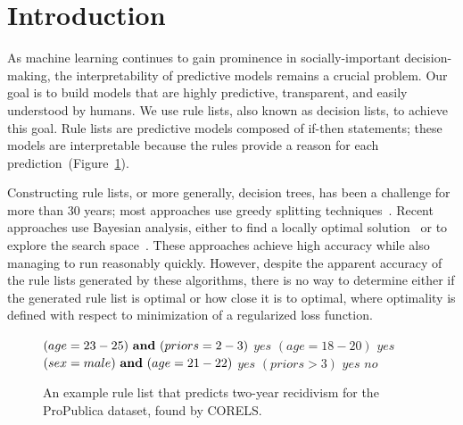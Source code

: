 \section{Introduction}

As machine learning continues to gain prominence in socially-important decision-making,
the interpretability of predictive models remains a crucial problem.
%
Our goal is to build models that are highly predictive, transparent, and easily understood by humans.
%
We use rule lists, also known as decision lists, to achieve this goal.
%
Rule lists are predictive models composed of if-then statements;
these models are interpretable because the rules provide a reason for each prediction~(Figure~\ref{fig:rule-list}).

Constructing rule lists, or more generally, decision trees, has been a challenge for more than
30 years; most approaches use greedy splitting techniques~\citep{Rivest87,Breiman84,Quinlan93}. 
%
Recent approaches use Bayesian analysis, either to find a locally optimal solution~\citep{Chipman:1998jh} or to explore the search space~\citep{LethamRuMcMa15, YangRuSe16}.
%
These approaches achieve high accuracy while also managing to run reasonably quickly.
%
However, despite the apparent accuracy of the rule lists generated by these algorithms,
there is no way to determine either if the generated rule list is optimal or how close it is to optimal,
where optimality is defined with respect to minimization of a regularized loss function.

\begin{arxiv}
\begin{figure}[t!]
\begin{algorithmic}
\State \bif $(age=23-25) {\bf ~and~} (priors=2-3)$ \bthen $yes$
\State \belif $(age=18-20)$ \bthen $yes$
\State \belif $(sex=male) {\bf ~and~} (age=21-22)$ \bthen $yes$
\State \belif $(priors>3)$ \bthen $yes$
\State \belse $no$
\end{algorithmic}
\caption{An example rule list that predicts two-year recidivism
for the ProPublica dataset, found by CORELS.
}
\label{fig:rule-list}
\end{figure}
\end{arxiv}

